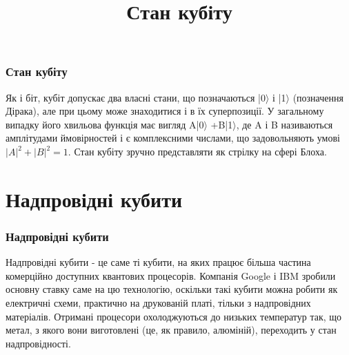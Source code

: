 \documentclass{beamer}
\begin{document}
\title{Стан кубіту}
\usebackgroundtemplate{}
\begin{frame}
\frametitle{Стан кубіту}
Як і біт, кубіт допускає два власні стани, що позначаються  |0$\rangle$ і   |1$\rangle$ (позначення Дірака), але при цьому може знаходитися і в їх суперпозиції. У загальному випадку його хвильова функція має вигляд    A|0$\rangle$ +B|1$\rangle$, де  A і B називаються амплітудами ймовірностей і є комплексними числами, що задовольняють умові   $|A|^{2}+|B|^{2}= 1$. Стан кубіту зручно представляти як стрілку на сфері Блоха.\\ 


\end{frame}
\section{Надпровідні кубити}
\usebackgroundtemplate{}
\begin{frame}
\frametitle{Надпровідні кубити}
Надпровідні кубити - це саме ті кубити, на яких працює більша частина комерційно доступних квантових процесорів. Компанія Google і IBM зробили основну ставку саме на цю технологію, оскільки такі кубити можна робити як електричні схеми, практично на друкованій платі, тільки з надпровідних матеріалів. Отримані процесори охолоджуються до низьких температур так, що метал, з якого вони виготовлені (це, як правило, алюміній), переходить у стан надпровідності. 


\end{frame}
\end{document}
